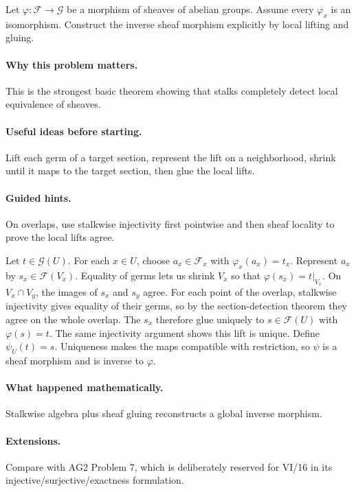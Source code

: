 \begin{problem}
Let $\varphi:\mathcal F\to\mathcal G$ be a morphism of sheaves of abelian groups. Assume every $\varphi_x$ is an isomorphism. Construct the inverse sheaf morphism explicitly by local lifting and gluing.
\end{problem}

\paragraph{Why this problem matters.}
This is the strongest basic theorem showing that stalks completely detect local equivalence of sheaves.

\paragraph{Useful ideas before starting.}
Lift each germ of a target section, represent the lift on a neighborhood, shrink until it maps to the target section, then glue the local lifts.

\paragraph{Guided hints.}
On overlaps, use stalkwise injectivity first pointwise and then sheaf locality to prove the local lifts agree.

\ifdefined\FullProblemDossiers
\begin{solution}
Let $t\in\mathcal G(U)$. For each $x\in U$, choose $a_x\in\mathcal F_x$ with $\varphi_x(a_x)=t_x$. Represent $a_x$ by $s_x\in\mathcal F(V_x)$. Equality of germs lets us shrink $V_x$ so that $\varphi(s_x)=t|_{V_x}$. On $V_x\cap V_y$, the images of $s_x$ and $s_y$ agree. For each point of the overlap, stalkwise injectivity gives equality of their germs, so by the section-detection theorem they agree on the whole overlap. The $s_x$ therefore glue uniquely to $s\in\mathcal F(U)$ with $\varphi(s)=t$. The same injectivity argument shows this lift is unique. Define $\psi_U(t)=s$. Uniqueness makes the maps compatible with restriction, so $\psi$ is a sheaf morphism and is inverse to $\varphi$.
\end{solution}

\paragraph{What happened mathematically.}
Stalkwise algebra plus sheaf gluing reconstructs a global inverse morphism.

\paragraph{Extensions.}
Compare with AG2 Problem 7, which is deliberately reserved for VI/16 in its injective/surjective/exactness formulation.
\fi
